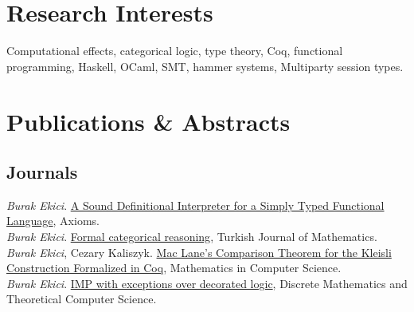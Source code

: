 \documentclass[10pt, a4paper]{article}
\newcommand{\years}[1]{\marginnote{\scriptsize #1}}
\begin{document}
\section*{Research Interests}
Computational effects, categorical logic, type theory, Coq, functional programming, Haskell, OCaml, SMT, hammer systems,
Multiparty session types.



\section*{Publications \& Abstracts}
\subsection*{Journals}

 \years{\normalsize2023}
\emph{Burak Ekici}.
{\href{https://www.mdpi.com/2075-1680/12/1/43/pdf}{A Sound Definitional Interpreter for a Simply Typed Functional Language}}, Axioms.
 \\[0.20cm]
 \years{\normalsize2022}
\emph{Burak Ekici}.
{\href{https://journals.tubitak.gov.tr/cgi/viewcontent.cgi?article=3178&context=math}{Formal categorical reasoning}}, Turkish Journal of Mathematics.
 \\[0.20cm]
 \years{\normalsize2020}
\emph{Burak Ekici}, Cezary Kaliszyk.
{\href{https://link.springer.com/content/pdf/10.1007%2Fs11786-020-00450-8.pdf}{Mac Lane’s Comparison Theorem for the Kleisli
Construction Formalized in Coq}}, Mathematics in Computer Science.
 \\[0.20cm]
\years{\normalsize2018}
\emph{Burak Ekici}.
\href{https://dmtcs.episciences.org/4927}{IMP with exceptions over decorated logic}, Discrete Mathematics and Theoretical Computer Science.
\end{document}
